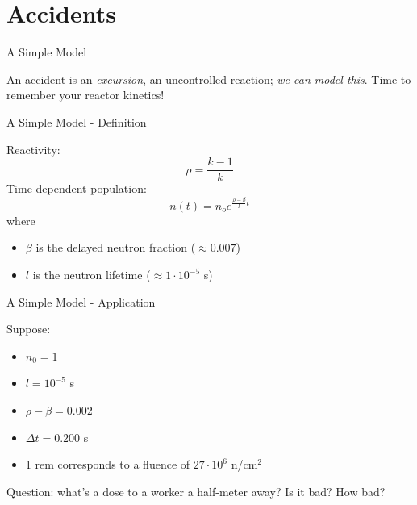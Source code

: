 \documentclass[10pt]{beamer}
\begin{document}
\section{Accidents}

\begin{frame}[fragile]{A Simple Model}

An accident is an {\it excursion}, an uncontrolled reaction; {\it we can
model this}.
\vfill
Time to remember your reactor kinetics!
\end{frame}

\begin{frame}[fragile]{A Simple Model - Definition}

Reactivity:
\begin{equation}
 \rho = \frac{k-1}{k} 
\end{equation}
Time-dependent population:
\begin{equation}
  n(t) =  n_o e^{\frac{\rho-\beta}{l}t}
\end{equation}
where
\begin{itemize}
 \item $\beta$ is the delayed neutron fraction ($\approx 0.007$)
 \item $l$ is the neutron lifetime ($\approx 1\cdot 10^{-5}$ s)
\end{itemize}

\end{frame}

\begin{frame}[fragile]{A Simple Model - Application}

Suppose:
\begin{itemize}
 \item $n_0 = 1$
 \item $l = 10^{-5}$ s
 \item $\rho-\beta = 0.002$
 \item $\Delta t = 0.200$ s
 \item 1 rem corresponds to a fluence of  $27\cdot 10^6$  n/cm$^2$
\end{itemize}
\vfill
\textcolor{mitred}{Question}: what's a dose to a worker a half-meter away?
  Is it bad? How bad?

\end{frame}
\end{document}
